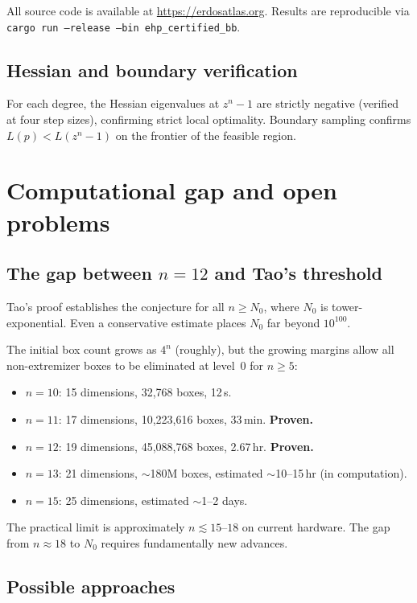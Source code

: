 \documentclass[11pt]{article}
\theoremstyle{plain}
\theoremstyle{definition}
\theoremstyle{remark}
\begin{document}
All source code is available at \url{https://erdosatlas.org}. Results are reproducible via \texttt{cargo run --release --bin ehp\_certified\_bb}.

\subsection{Hessian and boundary verification}

For each degree, the Hessian eigenvalues at $z^n - 1$ are strictly negative (verified at four step sizes), confirming strict local optimality. Boundary sampling confirms $L(p) < L(z^n - 1)$ on the frontier of the feasible region.

\section{Computational gap and open problems}
\label{sec:gap}

\subsection{The gap between $n = 12$ and Tao's threshold}

Tao's proof establishes the conjecture for all $n \geq N_0$, where $N_0$ is tower-exponential. Even a conservative estimate places $N_0$ far beyond $10^{100}$.

The initial box count grows as $4^{n}$ (roughly), but the growing margins allow all non-extremizer boxes to be eliminated at level~0 for $n \geq 5$:
\begin{itemize}[nosep]
\item $n = 10$: 15 dimensions, 32{,}768 boxes, 12\,s.
\item $n = 11$: 17 dimensions, 10{,}223{,}616 boxes, 33\,min. \textbf{Proven.}
\item $n = 12$: 19 dimensions, 45{,}088{,}768 boxes, 2.67\,hr. \textbf{Proven.}
\item $n = 13$: 21 dimensions, $\sim$180M boxes, estimated $\sim$10--15\,hr (in computation).
\item $n = 15$: 25 dimensions, estimated $\sim$1--2 days.
\end{itemize}

The practical limit is approximately $n \lesssim 15$--$18$ on current hardware. The gap from $n \approx 18$ to $N_0$ requires fundamentally new advances.

\subsection{Possible approaches}
\end{document}
